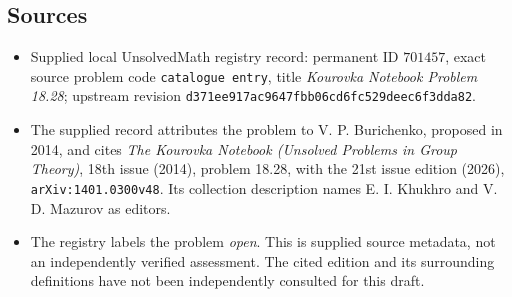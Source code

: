 \documentclass[11pt]{article}
\begin{document}
\subsection{Sources}
\begin{itemize}
\item Supplied local UnsolvedMath registry record: permanent ID \(701457\), exact source problem code \texttt{catalogue entry}, title \emph{Kourovka Notebook Problem 18.28}; upstream revision \texttt{d371ee917ac9647fbb06cd6fc529deec6f3dda82}.
\item The supplied record attributes the problem to V. P. Burichenko, proposed in 2014, and cites \emph{The Kourovka Notebook (Unsolved Problems in Group Theory)}, 18th issue (2014), problem 18.28, with the 21st issue edition (2026), \texttt{arXiv:1401.0300v48}. Its collection description names E. I. Khukhro and V. D. Mazurov as editors.
\item The registry labels the problem \emph{open}. This is supplied source metadata, not an independently verified assessment. The cited edition and its surrounding definitions have not been independently consulted for this draft.
\end{itemize}
\end{document}

